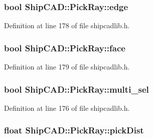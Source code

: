 \subsubsection[{\texorpdfstring{edge}{edge}}]{\setlength{\rightskip}{0pt plus 5cm}bool Ship\+C\+A\+D\+::\+Pick\+Ray\+::edge}\hypertarget{structShipCAD_1_1PickRay_a9882c4e0e43e2141cbaa196fe109cf19}{}\label{structShipCAD_1_1PickRay_a9882c4e0e43e2141cbaa196fe109cf19}


Definition at line 178 of file shipcadlib.\+h.

\subsubsection[{\texorpdfstring{face}{face}}]{\setlength{\rightskip}{0pt plus 5cm}bool Ship\+C\+A\+D\+::\+Pick\+Ray\+::face}\hypertarget{structShipCAD_1_1PickRay_a76218677660d84089b3db5a137410cec}{}\label{structShipCAD_1_1PickRay_a76218677660d84089b3db5a137410cec}


Definition at line 179 of file shipcadlib.\+h.

\subsubsection[{\texorpdfstring{multi\+\_\+sel}{multi_sel}}]{\setlength{\rightskip}{0pt plus 5cm}bool Ship\+C\+A\+D\+::\+Pick\+Ray\+::multi\+\_\+sel}\hypertarget{structShipCAD_1_1PickRay_a5b5dbf3de2afc804978a5e35ac582028}{}\label{structShipCAD_1_1PickRay_a5b5dbf3de2afc804978a5e35ac582028}


Definition at line 176 of file shipcadlib.\+h.

\subsubsection[{\texorpdfstring{pick\+Dist}{pickDist}}]{\setlength{\rightskip}{0pt plus 5cm}float Ship\+C\+A\+D\+::\+Pick\+Ray\+::pick\+Dist}\hypertarget{structShipCAD_1_1PickRay_aea6c9d67dc7245b1edf930dfe019d4db}{}\label{structShipCAD_1_1PickRay_aea6c9d67dc7245b1edf930dfe019d4db}


